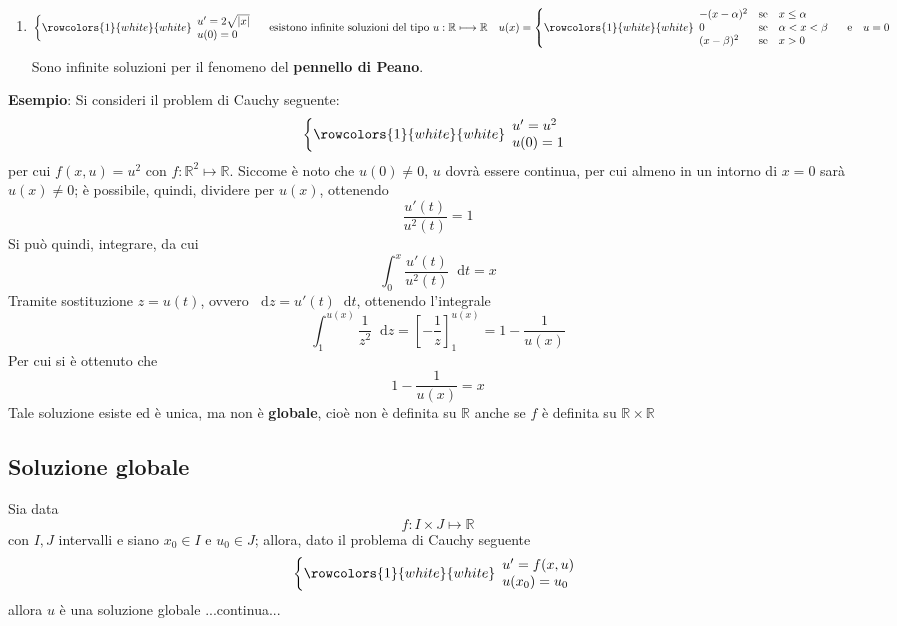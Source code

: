 \documentclass[a4paper]{extarticle}
\newcommand*\dif{\mathop{}\!\mathrm{d}}
\begin{document}
\begin{enumerate}
    \item \[\left\{
        \rowcolors{1}{white}{white}
        \begin{array}{lll}
            u'=2 \sqrt{\vert x \vert}\\
            u(0)=0
        \end{array}
    \right. \hspace{1em} \text{esistono infinite soluzioni del tipo } u : \mathbb{R} \longmapsto \mathbb{R} \hspace{1em} u(x)=\left\{
        \rowcolors{1}{white}{white}
        \begin{array}{lll}
            -(x-\alpha)^2 & \text{se} & x \leq \alpha\\
            0 & \text{se} & \alpha < x < \beta\\
            (x-\beta)^2 & \text{se} & x > 0\\
        \end{array}
    \right. \hspace{1em} \text{e} \hspace{1em} u=0\]
    Sono infinite soluzioni per il fenomeno del \textbf{pennello di Peano}.
\end{enumerate}

\vspace{2em}
\noindent
\textbf{Esempio}: Si consideri il problem di Cauchy seguente:
\[\left\{
    \rowcolors{1}{white}{white}
    \begin{array}{lll}
        u'=u^2\\
        u(0)=1\\
    \end{array}
\right.\]
per cui $f(x,u)=u^2$ con $f : \mathbb{R}^2 \longmapsto \mathbb{R}$. Siccome è noto che $u(0) \neq 0$, $u$ dovrà essere continua, per cui almeno in un intorno di $x=0$ sarà $u(x) \neq 0$; è possibile, quindi, dividere per $u(x)$, ottenendo
\[\dfrac{u'(t)}{u^2(t)} = 1\]
Si può quindi, integrare, da cui
\[\int_0^x \dfrac{u'(t)}{u^2(t)} \dif t = x\]
Tramite sostituzione $z=u(t)$, ovvero $\dif z = u'(t) \dif t$, ottenendo l'integrale
\[\int_1^{u(x)} \dfrac{1}{z^2} \dif z = \left[-\dfrac{1}{z}\right]_1^{u(x)} = 1 - \dfrac{1}{u(x)}\]
Per cui si è ottenuto che 
\[1 - \dfrac{1}{u(x)} = x\]
Tale soluzione esiste ed è unica, ma non è \textbf{globale}, cioè non è definita su $\mathbb{R}$ anche se $f$ è definita su $\mathbb{R} \times \mathbb{R}$

\vspace{1em}
\noindent
\subsection{Soluzione globale}
Sia data
\[f : I \times J \longmapsto \mathbb{R}\]
con $I,J$ intervalli e siano $x_0 \in I$ e $u_0 \in J$; allora, dato il problema di Cauchy seguente
\[\left\{
    \rowcolors{1}{white}{white}
    \begin{array}{lll}
        u'=f(x,u)\\
        u(x_0)=u_0\\
    \end{array}
\right.\]
allora $u$ è una soluzione globale ...continua...
\end{document}
